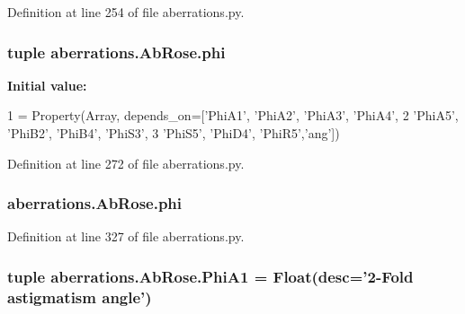 Definition at line 254 of file aberrations.\-py.

\hypertarget{classaberrations_1_1_ab_rose_af5d5d73602f028dc98eaca05b31af49d}{
\subsubsection[{phi}]{\setlength{\rightskip}{0pt plus 5cm}tuple aberrations.\-Ab\-Rose.\-phi\hspace{0.3cm}{\ttfamily [static]}}}\label{classaberrations_1_1_ab_rose_af5d5d73602f028dc98eaca05b31af49d}
{\bfseries Initial value\-:}
\begin{DoxyCode}
1 = Property(Array, depends\_on=[\textcolor{stringliteral}{'PhiA1'}, \textcolor{stringliteral}{'PhiA2'}, \textcolor{stringliteral}{'PhiA3'}, \textcolor{stringliteral}{'PhiA4'},
2                                       \textcolor{stringliteral}{'PhiA5'}, \textcolor{stringliteral}{'PhiB2'}, \textcolor{stringliteral}{'PhiB4'}, \textcolor{stringliteral}{'PhiS3'},
3                                       \textcolor{stringliteral}{'PhiS5'}, \textcolor{stringliteral}{'PhiD4'}, \textcolor{stringliteral}{'PhiR5'},\textcolor{stringliteral}{'ang'}])
\end{DoxyCode}


Definition at line 272 of file aberrations.\-py.

\hypertarget{classaberrations_1_1_ab_rose_a9a5a9ba368b3eab2b1920c7e8458b377}{
\subsubsection[{phi}]{\setlength{\rightskip}{0pt plus 5cm}aberrations.\-Ab\-Rose.\-phi}}\label{classaberrations_1_1_ab_rose_a9a5a9ba368b3eab2b1920c7e8458b377}


Definition at line 327 of file aberrations.\-py.

\hypertarget{classaberrations_1_1_ab_rose_a2c472cb55b3bfa8b0a338f9a5724d441}{
\subsubsection[{Phi\-A1}]{\setlength{\rightskip}{0pt plus 5cm}tuple aberrations.\-Ab\-Rose.\-Phi\-A1 = Float(desc='2-\/Fold astigmatism {\bf angle}')\hspace{0.3cm}{\ttfamily [static]}}}\label{classaberrations_1_1_ab_rose_a2c472cb55b3bfa8b0a338f9a5724d441}


